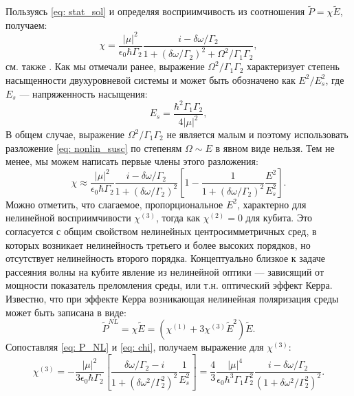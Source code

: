 Пользуясь \eqref{eq: stat_sol} и определяя восприимчивость из соотношения $\tilde{P} = \chi\tilde{E}$, получаем:
\begin{equation}
\chi = \frac{|\mu|^2}{\epsilon_0\hbar\Gamma_2}\frac{i-\delta\omega/\Gamma_2}{1+(\delta\omega/\Gamma_2)^2 + \Omega^2/\Gamma_1\Gamma_2},
\end{equation}
см. также \cite{boyd2003nonlinear}. Как мы отмечали ранее, выражение $\Omega^2/\Gamma_1\Gamma_2$ характеризует степень насыщенности двухуровневой системы и может быть обозначено как ${E^2}/{E^2_s}$, где $E_s$ --- напряженность насыщения: 
\begin{equation}
E_s = \frac{\hbar^2\Gamma_1\Gamma_2}{4|\mu|^2},
\label{eq: E_s}
\end{equation}
В общем случае, выражение $\Omega^2/\Gamma_1\Gamma_2$ не является малым и поэтому использовать разложение \eqref{eq: nonlin_susc} по степеням $\Omega \sim E$ в явном виде нельзя. Тем не менее, мы можем написать первые члены этого разложения:  
\begin{equation}
\chi\approx\frac{|\mu|^2}{\epsilon_0\hbar\Gamma_2}\frac{i-\delta\omega/\Gamma_2}{1+(\delta\omega/\Gamma_2)^2}\left[1-\frac{1}{1+(\delta\omega/\Gamma_2)^2}\frac{E^2}{E^2_s}\right].
\label{eq: chi}
\end{equation}
Можно отметить, что слагаемое, пропорциональное $E^2$, характерно для нелинейной восприимчивости $\chi^{(3)}$, тогда как $\chi^{(2)}=0$ для кубита. Это согласуется с общим свойством нелинейных центросимметричных сред, в которых возникает нелинейность третьего и более высоких порядков, но отсутствует нелинейность второго порядка. 
Концептуально близкое к задаче рассеяния волны на кубите явление из нелинейной оптики --- зависящий от мощности показатель преломления среды, или т.н. оптический эффект Керра. Известно, что при эффекте Керра возникающая нелинейная поляризация среды может быть записана в виде:
\begin{equation}
\tilde{P}^{N\!L} = \chi \tilde{E} = \left(\chi^{(1)} + 3\chi^{(3)}\tilde{E}^2\right)\tilde{E}.
\label{eq: P_NL}
\end{equation}
Сопоставляя \eqref{eq: P_NL} и \eqref{eq: chi}, получаем выражение для $\chi^{(3)}$:
\begin{equation}
\chi^{(3)} = -\frac{|\mu|^2}{3\epsilon_0\hbar\Gamma_2}\left[\frac{\delta\omega/\Gamma_2-i}{1+(\delta\omega^2/\Gamma^2_2)^2}\frac{1}{E^2_s}\right] = \frac{4}{3}\frac{|\mu|^4}{\epsilon_0\hbar^3\Gamma_1\Gamma_2^2}\frac{i-\delta\omega/\Gamma_2}{(1+\delta\omega^2/\Gamma_2^2)^2}.
\label{eq: chi_3}
\end{equation}
